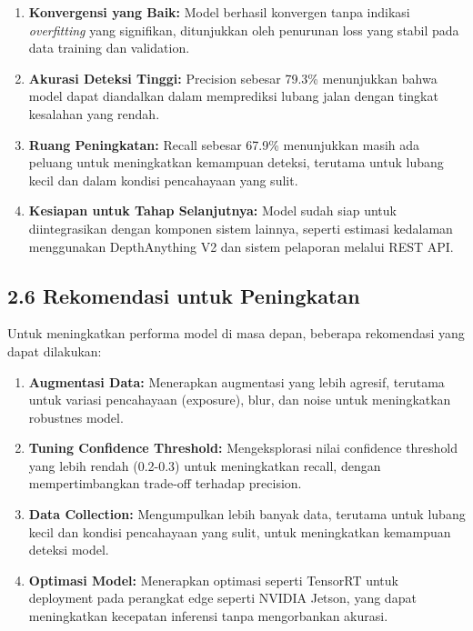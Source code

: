 \documentclass[12pt,a4paper]{article}
\begin{document}
\begin{enumerate}
    \item \textbf{Konvergensi yang Baik:} Model berhasil konvergen tanpa indikasi \textit{overfitting} yang signifikan, ditunjukkan oleh penurunan loss yang stabil pada data training dan validation.
    
    \item \textbf{Akurasi Deteksi Tinggi:} Precision sebesar 79.3\% menunjukkan bahwa model dapat diandalkan dalam memprediksi lubang jalan dengan tingkat kesalahan yang rendah.
    
    \item \textbf{Ruang Peningkatan:} Recall sebesar 67.9\% menunjukkan masih ada peluang untuk meningkatkan kemampuan deteksi, terutama untuk lubang kecil dan dalam kondisi pencahayaan yang sulit.
    
    \item \textbf{Kesiapan untuk Tahap Selanjutnya:} Model sudah siap untuk diintegrasikan dengan komponen sistem lainnya, seperti estimasi kedalaman menggunakan DepthAnything V2 dan sistem pelaporan melalui REST API.
\end{enumerate}

\subsection*{2.6 Rekomendasi untuk Peningkatan}

Untuk meningkatkan performa model di masa depan, beberapa rekomendasi yang dapat dilakukan:

\begin{enumerate}
    \item \textbf{Augmentasi Data:} Menerapkan augmentasi yang lebih agresif, terutama untuk variasi pencahayaan (exposure), blur, dan noise untuk meningkatkan robustnes model.
    
    \item \textbf{Tuning Confidence Threshold:} Mengeksplorasi nilai confidence threshold yang lebih rendah (0.2-0.3) untuk meningkatkan recall, dengan mempertimbangkan trade-off terhadap precision.
    
    \item \textbf{Data Collection:} Mengumpulkan lebih banyak data, terutama untuk lubang kecil dan kondisi pencahayaan yang sulit, untuk meningkatkan kemampuan deteksi model.
    
    \item \textbf{Optimasi Model:} Menerapkan optimasi seperti TensorRT untuk deployment pada perangkat edge seperti NVIDIA Jetson, yang dapat meningkatkan kecepatan inferensi tanpa mengorbankan akurasi.
\end{enumerate}
\end{document}
